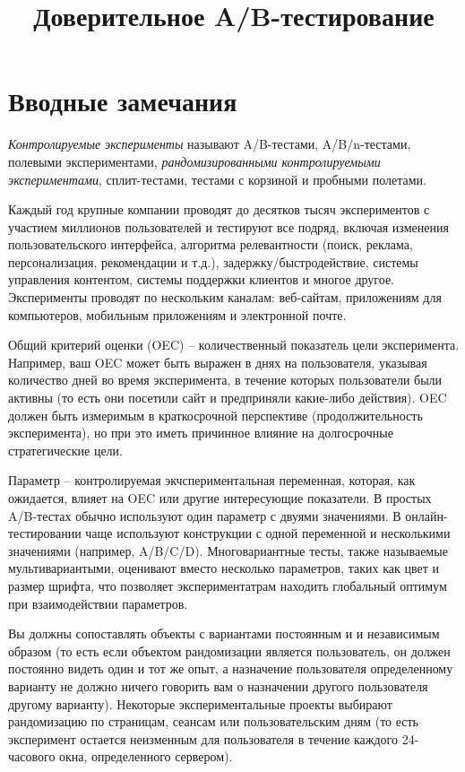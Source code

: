 \documentclass[%
	11pt,
	a4paper,
	utf8,
		]{article}
\begin{document}
\title{Доверительное A/B-тестирование}

\author{}

\date{}
\maketitle

\thispagestyle{fancy}

\tableofcontents

\section{Вводные замечания}

\emph{Контролируемые эксперименты} называют A/B-тестами, A/B/n-тестами, полевыми экспериментами, \emph{рандомизированными контролируемыми экспериментами}, сплит-тестами, тестами с корзиной и пробными полетами.

Каждый год крупные компании проводят до десятков тысяч экспериментов с участием миллионов пользователей и тестируют все подряд, включая изменения пользовательского интерфейса, алгоритма релевантности (поиск, реклама, персонализация, рекомендации и т.д.), задержку/быстродействие, системы управления контентом, системы поддержки клиентов и многое другое. Эксперименты проводят по нескольким каналам: веб-сайтам, приложениям для компьютеров, мобильным приложениям и электронной почте.

Общий критерий оценки (OEC) -- количественный показатель цели эксперимента. Например, ваш OEC может быть выражен в днях на пользователя, указывая количество дней во время эксперимента, в течение которых пользователи были активны (то есть они посетили сайт и предприняли какие-либо действия). OEC должен быть измеримым в краткосрочной перспективе (продолжительность эксперимента), но при это иметь причинное влияние на долгосрочные стратегические цели.

Параметр -- контролируемая экчспериментальная переменная, которая, как ожидается, влияет на OEC или другие интересующие показатели. В простых A/B-тестах обычно используют один параметр с двуями значениями. В онлайн-тестировании чаще используют конструкции с одной переменной и несколькими значениями (например, A/B/C/D). Многовариантные тесты, также называемые мультивариантыми, оценивают вместо несколько параметров, таких как цвет и размер шрифта, что позволяет экспериментатрам находить глобальный оптимум при взаимодействии параметров.

Вы должны сопоставлять объекты с вариантами постоянным и и независимым образом (то есть если объектом рандомизации является пользователь, он должен постоянно видеть один и тот же опыт, а назначение пользователя определенному варианту не должно ничего говорить вам о назначении другого пользователя другому варианту). Некоторые экспериментальные проекты выбирают рандомизацию по страницам, сеансам или пользовательским дням (то есть эксперимент остается неизменным для пользователя в течение каждого 24-часового окна, определенного сервером). 
\end{document}
